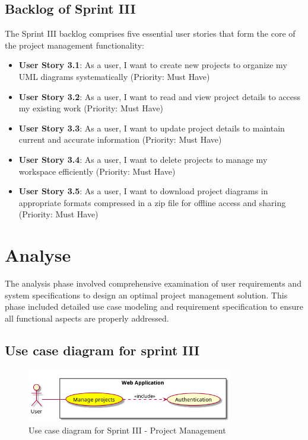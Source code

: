 \subsection{Backlog of Sprint III}

The Sprint III backlog comprises five essential user stories that form the core of the project management functionality:

\begin{itemize}
\item \textbf{User Story 3.1}: As a user, I want to create new projects to organize my UML diagrams systematically (Priority: Must Have)
\item \textbf{User Story 3.2}: As a user, I want to read and view project details to access my existing work (Priority: Must Have)
\item \textbf{User Story 3.3}: As a user, I want to update project details to maintain current and accurate information (Priority: Must Have)
\item \textbf{User Story 3.4}: As a user, I want to delete projects to manage my workspace efficiently (Priority: Must Have)
\item \textbf{User Story 3.5}: As a user, I want to download project diagrams in appropriate formats compressed in a zip file for offline access and sharing (Priority: Must Have)
\end{itemize}

\section{Analyse}

The analysis phase involved comprehensive examination of user requirements and system specifications to design an optimal project management solution. This phase included detailed use case modeling and requirement specification to ensure all functional aspects are properly addressed.

\subsection{Use case diagram for sprint III}

\begin{figure}[H]
\centering
\includegraphics[width=0.8\textwidth]{conception/SprintIII/use_case_diagrams/use_case_diagram_of_SprintIII.png}
\caption{Use case diagram for Sprint III - Project Management}
\label{fig:use_case_sprint3}
\end{figure}

